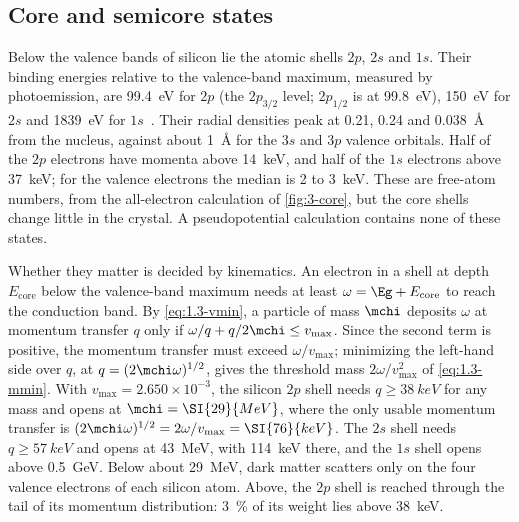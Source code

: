 \subsection{Core and semicore states}

Below the valence bands of silicon lie the atomic shells $2p$, $2s$ and $1s$. Their binding energies relative to the valence-band maximum, measured by photoemission, are \SI{99.4}{eV} for $2p$ (the $2p_{3/2}$ level; $2p_{1/2}$ is at \SI{99.8}{eV}), \SI{150}{eV} for $2s$ and \SI{1839}{eV} for $1s$~\cite[Table~1-1]{williams2009electron}. Their radial densities peak at 0.21, 0.24 and \SI{0.038}{\angstrom} from the nucleus, against about \SI{1}{\angstrom} for the $3s$ and $3p$ valence orbitals. Half of the $2p$ electrons have momenta above \SI{14}{keV}, and half of the $1s$ electrons above \SI{37}{keV}; for the valence electrons the median is 2 to \SI{3}{keV}. These are free-atom numbers, from the all-electron calculation of \cref{fig:3-core}, but the core shells change little in the crystal. A pseudopotential calculation contains none of these states.

Whether they matter is decided by kinematics. An electron in a shell at depth $E_{\mathrm{core}}$ below the valence-band maximum needs at least $\omega = \Eg + E_{\mathrm{core}}$ to reach the conduction band. By \cref{eq:1.3-vmin}, a particle of mass $\mchi$ deposits $\omega$ at momentum transfer $q$ only if $\omega/q + q/2\mchi \le v_{\mathrm{max}}$. Since the second term is positive, the momentum transfer must exceed $\omega/v_{\mathrm{max}}$; minimizing the left-hand side over $q$, at $q = (2\mchi\omega)^{1/2}$, gives the threshold mass $2\omega/v_{\mathrm{max}}^2$ of \cref{eq:1.3-mmin}. With $v_{\mathrm{max}} = 2.650\times10^{-3}$, the silicon $2p$ shell needs $q \ge \SI{38}{keV}$ for any mass and opens at $\mchi = \SI{29}{MeV}$, where the only usable momentum transfer is $(2\mchi\omega)^{1/2} = 2\omega/v_{\mathrm{max}} = \SI{76}{keV}$. The $2s$ shell needs $q \ge \SI{57}{keV}$ and opens at \SI{43}{MeV}, with \SI{114}{keV} there, and the $1s$ shell opens above \SI{0.5}{GeV}. Below about \SI{29}{MeV}, dark matter scatters only on the four valence electrons of each silicon atom. Above, the $2p$ shell is reached through the tail of its momentum distribution: \SI{3}{\percent} of its weight lies above \SI{38}{keV}.

